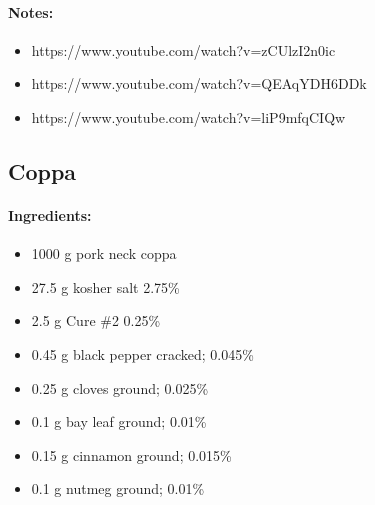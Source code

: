 \documentclass{article}
\begin{document}
\paragraph{Notes:}
\begin{itemize}
    \item https://www.youtube.com/watch?v=zCUlzI2n0ic
    \item https://www.youtube.com/watch?v=QEAqYDH6DDk
    \item https://www.youtube.com/watch?v=liP9mfqCIQw
\end{itemize}

\subsection{Coppa}

\paragraph{Ingredients:}
\begin{itemize}
    \item 1000 g pork neck coppa
    \item 27.5 g kosher salt 2.75\%
    \item 2.5 g Cure \#2 0.25\%
    \item 0.45 g black pepper cracked; 0.045\%
    \item 0.25 g cloves ground; 0.025\%
    \item 0.1 g bay leaf ground; 0.01\%
    \item 0.15 g cinnamon ground; 0.015\%
    \item 0.1 g nutmeg ground; 0.01\%
\end{itemize}
\end{document}
